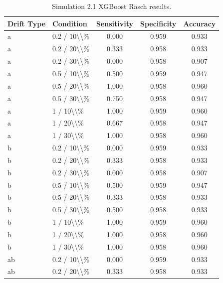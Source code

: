 \begin{table}[!h]
\centering
\caption{\label{tab:tab:sim21_xgb_rasch}Simulation 2.1 XGBoost Rasch results.}
\centering
\begin{tabular}[t]{llccc}
\toprule
Drift Type & Condition & Sensitivity & Specificity & Accuracy\\
\midrule
a & 0.2 / 10\textbackslash{}\textbackslash{}\% & 0.000 & 0.959 & 0.933\\
a & 0.2 / 20\textbackslash{}\textbackslash{}\% & 0.333 & 0.958 & 0.933\\
a & 0.2 / 30\textbackslash{}\textbackslash{}\% & 0.000 & 0.958 & 0.907\\
a & 0.5 / 10\textbackslash{}\textbackslash{}\% & 0.500 & 0.959 & 0.947\\
a & 0.5 / 20\textbackslash{}\textbackslash{}\% & 1.000 & 0.958 & 0.960\\
\addlinespace
a & 0.5 / 30\textbackslash{}\textbackslash{}\% & 0.750 & 0.958 & 0.947\\
a & 1 / 10\textbackslash{}\textbackslash{}\% & 1.000 & 0.959 & 0.960\\
a & 1 / 20\textbackslash{}\textbackslash{}\% & 0.667 & 0.958 & 0.947\\
a & 1 / 30\textbackslash{}\textbackslash{}\% & 1.000 & 0.958 & 0.960\\
b & 0.2 / 10\textbackslash{}\textbackslash{}\% & 0.000 & 0.959 & 0.933\\
\addlinespace
b & 0.2 / 20\textbackslash{}\textbackslash{}\% & 0.333 & 0.958 & 0.933\\
b & 0.2 / 30\textbackslash{}\textbackslash{}\% & 0.000 & 0.958 & 0.907\\
b & 0.5 / 10\textbackslash{}\textbackslash{}\% & 0.500 & 0.959 & 0.947\\
b & 0.5 / 20\textbackslash{}\textbackslash{}\% & 0.333 & 0.958 & 0.933\\
b & 0.5 / 30\textbackslash{}\textbackslash{}\% & 0.500 & 0.958 & 0.933\\
\addlinespace
b & 1 / 10\textbackslash{}\textbackslash{}\% & 1.000 & 0.959 & 0.960\\
b & 1 / 20\textbackslash{}\textbackslash{}\% & 1.000 & 0.958 & 0.960\\
b & 1 / 30\textbackslash{}\textbackslash{}\% & 1.000 & 0.958 & 0.960\\
ab & 0.2 / 10\textbackslash{}\textbackslash{}\% & 0.000 & 0.959 & 0.933\\
ab & 0.2 / 20\textbackslash{}\textbackslash{}\% & 0.333 & 0.958 & 0.933\\

\end{tabular}
\end{table}
